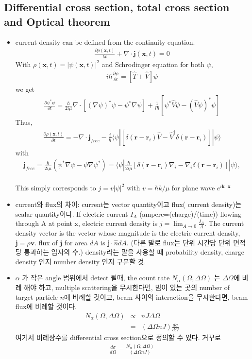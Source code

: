 \documentclass[10pt]{book}
\def\bm{\boldsymbol}
\newcommand{\bea}{\begin{eqnarray}}
\newcommand{\eea}{\end{eqnarray}}
\newcommand{\no}{\nonumber \\}
\newcommand{\del}{\partial}
\def\vk{{\bm k}}
\def\vx{{\bm x}}
\def\vr{{\bm r}}
\def\la{\langle}
\def\ra{\rangle}
\begin{document}
\subsection{Differential cross section, total cross section and
 Optical theorem}
\begin{itemize}
\item current density can be defined from the continuity equation.
\bea
\frac{\del \rho(\vx,t)}{\del t}+\nabla\cdot {\bm j}(\vx,t)=0 
\eea 
With $\rho(\vx,t)=|\psi(\vx,t)|^2$ and Schrodinger equation for both $\psi$,
\bea 
i\hbar\frac{\del \psi}{\del t}=[\hat{T}+\hat{V}]\psi 
\eea  
we get
\bea 
\frac{\del \psi^* \psi}{\del t}=
  \frac{\hbar}{2i\mu}\nabla\cdot[ (\nabla\psi)^*\psi-\psi^*\nabla\psi]
  +\frac{1}{i\hbar}[\psi^*\hat{V}\psi-(\hat{V}\psi)^*\psi]
\eea 
Thus, 
\bea 
\frac{\del \rho(\vx,t)}{\del t}
=-\nabla\cdot {\bm j}_{free} 
 -\frac{i}{\hbar}\la \psi|\left[ \delta(\vr-\vr_i)\hat{V}-\hat{V}^\dagger \delta(\vr-\vr_i)\right] |\psi\ra 
\eea 
with 
\bea 
{\bm j}_{free}=\frac{\hbar}{2i\mu}(\psi^*\nabla\psi-\psi\nabla\psi^*)
   =\la \psi| \frac{\hbar}{2i\mu}\left[ \delta(\vr-\vr_i)\nabla_i
    -\nabla_i \delta(\vr-\vr_i) \right] |\psi\ra ,\no     
\eea 

This simply corresponds to $j=v|\psi|^2$ with $v=\hbar k/\mu$ for plane wave $e^{i \vk\cdot\vx}$

\item current와 flux의 차이: current는 vector quantity이고 flux( current density)는 scalar quantity이다. 
If electric current $I_A$ (ampere=(charge)/(time)) flowing through A at point x,
electric current density is $j=\lim_{A\to 0}\frac{I_A}{A} $.
The current density vector is the vector whose magnitude is the electric current density,
${\bm j}=\rho{\bm v}$. flux of ${\bm j}$ for area $dA$ is ${\bm j}\cdot\hat{n} dA$.  
(다른 말로 flux는 단위 시간당 단위 면적당 통과하는 입자의 수.)
density라는 말을 사용할 때 probability density, charge density 인지 number density 인지 구분할 것. 

\item $\alpha$ 가 작은 angle 범위에서 detect 될때, 
the count rate $N_\alpha(\Omega,\Delta\Omega)$ 는 $\Delta\Omega$에 비례 해야 하고, 
multiple scattering을 무시한다면, 빔이 있는 곳의 number of target particle $n$에 비례할 것이고,
beam 사이의 interaction을 무시한다면, beam flux에 비례할 것이다. 
\bea 
N_\alpha(\Omega,\Delta\Omega) &\propto& n J \Delta\Omega \no 
   &=& (\Delta\Omega n J )\frac{d\sigma}{d\Omega}
\eea 
여기서 비례상수를 differential cross section으로 정의할 수 있다. 
거꾸로 
\bea 
\frac{d\sigma}{d\Omega} = \frac{N_\alpha(\Omega,\Delta\Omega)}{(\Delta\Omega n J )}
\eea 


\end{itemize}
\end{document}
